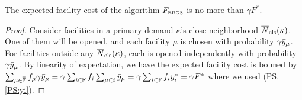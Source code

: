 \begin{lemma} \label{lem: EBGS facility cost}
  The expected facility cost of the algorithm $F_{\mbox{\tiny\rm EBGS}}$ is no more
  than $\gamma F^\ast$.
\end{lemma}
\begin{proof}
  Consider facilities in a primary demand $\kappa$'s close
  neighborhood ${\overline{N}}_{\text{cls}}(\kappa)$. One of them will be opened, and
  each facility $\mu$ is chosen with probability $\gamma
  {\bar y}_{\mu}$. For facilities outside any ${\overline{N}}_{\text{cls}}(\kappa)$, each
  is opened independently with probability $\gamma {\bar y}_{\mu}$. By
  linearity of expectation, we have the expected facility cost is
  bouned by $\sum_{\mu \in \overline{\mathbb{F}}} f_\mu \gamma {\bar y}_{\mu} =
  \gamma \sum_{i\in \mathbb{F}} f_i \sum_{\mu\in i} {\bar y}_{\mu} =
  \gamma \sum_{i \in \mathbb{F}} f_i y_i^\ast = \gamma F^\ast$ where we
  used (PS.\ref{PS:yi}).

\end{proof}

